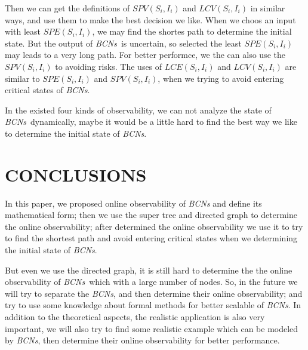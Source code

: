 \documentclass[conference]{IEEEtran} %
\def \BCNs {{\em BCNs}}
\begin{document}
Then we can get the definitions of $SPV(S_i, I_i)$ and $LCV(S_i, I_i)$ in similar ways, and use them to make the best decision we like. When we choos an input with least $SPE(S_i, I_i)$, we may find the shortes path to determine the initial state. But the output of \BCNs\ is uncertain, so selected the least $SPE(S_i, I_i)$ may leads to a very long path. For better performce, we the can also use the $SPV(S_i, I_i)$ to avoiding risks. The uses of $LCE(S_i, I_i)$ and $LCV(S_i, I_i)$ are similar to $SPE(S_i, I_i)$ and $SPV(S_i, I_i)$, when we trying to avoid entering critical states of {\em BCNs}.

In the existed four kinds of observability, we can not analyze the state of \BCNs\ dynamically, maybe it would be a little hard to find the best way we like to determine the initial state of {\em BCNs}.
\section{CONCLUSIONS}

In this paper, we proposed online observability of {\em BCNs} and define its mathematical form;  then we use the super tree and directed graph to determine the online observability; after determined the online observability we use it to try to find the shortest path and avoid entering critical states when we determining the initial state of {\em BCNs}. 

But even we use the directed graph, it is still hard to determine the  the online observability of \BCNs\ which with a large number of nodes. So, in the future we will try to separate the {\em BCNs}, and then determine their online observability; and try to use some knowledge about formal methods for better scalable of {\em BCNs}. In addition to the theoretical aspects, the realistic application is also very important, we will also try to find some realistic example which can be modeled by {\em BCNs}, then determine their online observability for better performance.
\addtolength{\textheight}{-12cm}   %
\end{document}
